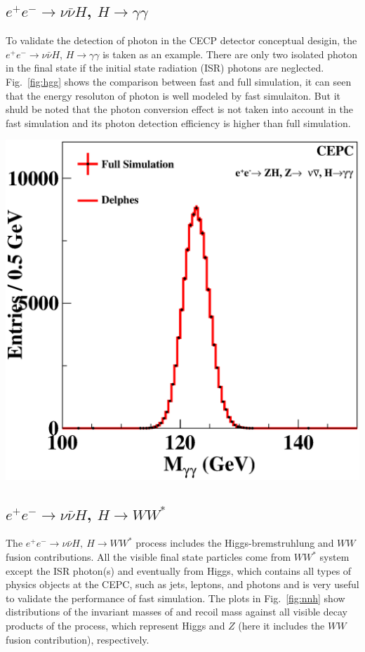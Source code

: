 \documentclass[a4paper,10pt,twoside]{cpc-hepnp}
\begin{document}
\begin{multicols}{2}
\subsection{$e^+e^-\to \nu\bar{\nu}H$, $H \to \gamma \gamma$}
To validate the detection of photon in the CECP detector conceptual desigin,
the $e^+e^- \to \nu\bar{\nu}H$, $H\to \gamma \gamma$ is taken as an example.
There are only two isolated photon in the final state if the initial state radiation (ISR) photons are neglected.
Fig.~\ref{fig:hgg} shows the comparison between fast and full simulation,
it can seen that the energy resoluton of photon is well modeled by fast simulaiton.
But it shuld be noted that the photon conversion effect is not taken into account in the fast simulation
and its photon detection efficiency is higher than full simulation.
\begin{center}
\includegraphics[width=0.8\linewidth]{figs/gg_h}
\end{center}

\subsection{$e^+e^-\to \nu\bar{\nu}H$, $H \to WW^*$}

The $e^+e^- \to \nu\bar{\nu}H,~H\to WW^*$ process includes the Higgs-bremstruhlung and $WW$ fusion  contributions.
All the visible final state particles come from $WW^*$ system except the ISR photon(s) and eventually from Higgs,
which contains all types of physics objects at the CEPC, such as jets, leptons, and photons
and is very useful to validate the performance of fast simulation.
The plots in Fig.~\ref{fig:nnh} show distributions of the invariant masses of and recoil mass against all visible decay products of the process,
which represent Higgs and $Z$ (here it includes the $WW$ fusion contribution), respectively.



\end{multicols}
\end{document}
